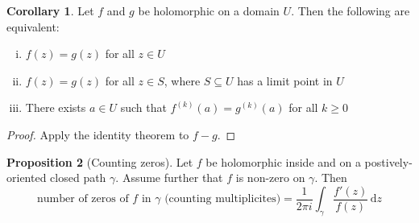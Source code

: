 \documentclass[10pt,fleqn]{article}
\newcommand{\diff}{\,\mathrm{d}}
\theoremstyle{definition} \newtheorem{defn}{Definition}[section]
\theoremstyle{plain}      \newtheorem{thm}[defn]{Theorem}
\theoremstyle{definition} \newtheorem{prop}[defn]{Proposition}
\theoremstyle{plain}      \newtheorem{lem}[defn]{Lemma}
\theoremstyle{definition} \newtheorem{cor}[defn]{Corollary}
\theoremstyle{definition} \newtheorem{ex}[defn]{Example}
\theoremstyle{definition} \newtheorem{rem}[defn]{Remark}
\begin{document}
\begin{cor}
    Let $f$ and $g$ be holomorphic on a domain $U$.
    Then the following are equivalent:
    \begin{enumerate}[(i)]
        \item $f(z)=g(z)$ for all $z\in U$
        \item $f(z)=g(z)$ for all $z\in S$, where $S\subseteq U$ has a limit point in $U$
        \item There exists $a\in U$ such that $f^{(k)}(a)=g^{(k)}(a)$ for all $k\geq0$
    \end{enumerate}
\end{cor}

\begin{proof}
    Apply the identity theorem to $f-g$.
\end{proof}

\begin{prop}[Counting zeros]
    Let $f$ be holomorphic inside and on a postively-oriented closed path $\gamma$.
    Assume further that $f$ is non-zero on $\gamma$.
    Then
    \begin{equation}
        \text{number of zeros of }f\text{ in }\gamma\text{ (counting multiplicites)}=
        \frac{1}{2\pi i}\int_{\gamma}\frac{f'(z)}{f(z)}\diff z
    \end{equation}
\end{prop}
\end{document}
